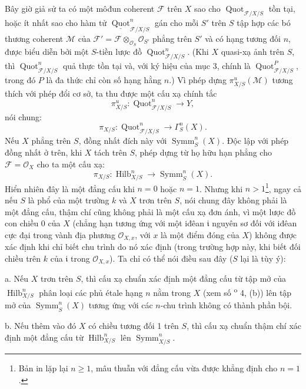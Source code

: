 \documentclass[11pt,twoside,openany]{book}
\numberwithin{equation}{section}
\newcommand{\src}[1]{%
  \phantomsection\hypertarget{src:\fgasourceid:#1}{}%
  \marginpar{\raggedleft\footnotesize\sffamily #1}%
}
\newcommand{\fgasourceid}{unset}
\begin{document}
Bây giờ giả sử ta có một môđun coherent $\mathcal F$ trên $X$ sao cho
$\operatorname{Quot}_{\mathcal F/X/S}$ tồn tại, hoặc ít nhất sao cho hàm tử
$\underline{\operatorname{Quot}}^n_{\mathcal F/X/S}$ gán cho mỗi $S'$ trên
$S$ tập hợp các bó thương coherent $\mathcal M$ của
$\mathcal F'=\mathcal F\otimes_{\mathcal O_S}\mathcal O_{S'}$ phẳng trên
$S'$ và có hạng tương đối $n$, được biểu diễn bởi một $S$-tiền lược đồ
$\operatorname{Quot}^n_{\mathcal F/X/S}$. (Khi $X$ quasi-xạ ảnh trên $S$,
thì $\operatorname{Quot}^n_{\mathcal F/X/S}$ quả thực tồn tại và, với ký hiệu
của mục 3, chính là $\operatorname{Quot}^P_{\mathcal F/X/S}$, trong đó $P$ là
đa thức chỉ còn số hạng hằng $n$.) Vì phép dựng
$\pi^u_{X/S}(\mathcal M)$ tương thích với phép đổi cơ sở, ta thu được một cấu
xạ chính tắc
\[
\pi^u_{X/S}:\operatorname{Quot}^n_{\mathcal F/X/S}\longrightarrow Y,
\]
nói chung:
\[
\pi_{X/S}:\operatorname{Quot}^n_{\mathcal F/X/S}
\longrightarrow\Gamma^n_S(X).
\]
Nếu $X$ phẳng trên $S$, đồng nhất đích này với $\operatorname{Symm}^n_S(X)$.
Độc lập với phép đồng nhất ở trên, khi $X$ tách trên $S$, phép dựng từ họ hữu hạn phẳng cho $\mathcal F=\mathcal O_X$ cho ta một cấu xạ:
\[
\pi_{X/S}:\operatorname{Hilb}^n_{X/S}
\longrightarrow\operatorname{Symm}^n_S(X).
\]
Hiển nhiên đây là một đẳng cấu khi $n=0$ hoặc $n=1$. Nhưng khi
$n>1$\footnote{Bản in lặp lại $n\geq1$, mâu thuẫn với đẳng cấu vừa được khẳng
định cho $n=1$.}, ngay cả nếu $S$ là phổ của một trường $k$ và $X$ trơn trên
$S$, nói chung đây không phải là một đẳng cấu, thậm chí cũng không phải là một
cấu xạ đơn ánh, vì một lược đồ con chiều 0 của $X$ (chẳng hạn tương ứng với
một iđêan $\mathfrak i$ nguyên sơ đối với iđêan cực đại trong vành địa phương
$\mathcal O_{X,x}$, với $x$ là một điểm đóng của $X$) không được xác định khi
chỉ biết chu trình do nó xác định (trong trường hợp này, khi biết đối chiều
trên $k$ của $\mathfrak i$ trong $\mathcal O_{X,x}$). Ta chỉ có thể nói điều
sau đây ($S$ lại là tùy ý):

\medskip
\noindent a. Nếu $X$ trơn trên $S$, thì cấu xạ chuẩn xác định một đẳng cấu từ
tập mở của $\operatorname{Hilb}^n_{X/S}$ phân loại các phủ étale hạng $n$ nằm
trong $X$ (xem số \textsuperscript{o} 4, (b)) lên tập mở của
$\operatorname{Symm}^n_S(X)$ tương ứng với các $n$-chu trình không có thành
phần bội.
\src{275}

\medskip
\noindent b. Nếu thêm vào đó $X$ có chiều tương đối 1 trên $S$, thì cấu xạ
chuẩn thậm chí xác định một đẳng cấu từ $\operatorname{Hilb}^n_{X/S}$ lên
$\operatorname{Symm}^n_{X/S}$.
\end{document}
